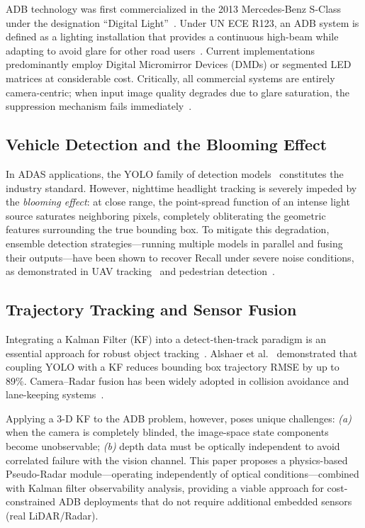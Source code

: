 \documentclass{jstarticle}
\theoremstyle{remark}
\begin{document}
ADB technology was first commercialized in the 2013 Mercedes-Benz
S-Class under the designation ``Digital Light''~\cite{Bathla2022AutonomousVehicles}.
Under UN ECE R123, an ADB system is defined as a lighting installation
that provides a continuous high-beam while adapting to avoid glare for
other road users~\cite{Shin2026DOE_AFS}. Current implementations predominantly
employ Digital Micromirror Devices (DMDs) or segmented LED matrices at
considerable cost. Critically, all commercial systems are entirely
camera-centric; when input image quality degrades due to glare
saturation, the suppression mechanism fails
immediately~\cite{Kumar2015AutonomousVehicles}.

\subsection{Vehicle Detection and the Blooming Effect}
\label{subsec:detection}

In ADAS applications, the YOLO family of detection
models~\cite{Khanam2024YOLOv5, SCIRP126758} constitutes the industry
standard. However, nighttime headlight tracking is severely impeded by
the \emph{blooming effect}: at close range, the point-spread function of
an intense light source saturates neighboring pixels, completely
obliterating the geometric features surrounding the true bounding box.
To mitigate this degradation, ensemble detection strategies---running
multiple models in parallel and fusing their outputs---have been shown
to recover Recall under severe noise conditions, as demonstrated in UAV
tracking~\cite{Alshaer2025UAV} and pedestrian
detection~\cite{Dollar2014FastPyramids}.

\subsection{Trajectory Tracking and Sensor Fusion}
\label{subsec:kf}

Integrating a Kalman Filter (KF) into a detect-then-track paradigm is
an essential approach for robust object tracking~\cite{Kalman1960}.
Alshaer et al.~\cite{Alshaer2025UAV} demonstrated that coupling YOLO
with a KF reduces bounding box trajectory RMSE by up to 89\%.
Camera--Radar fusion has been widely adopted in collision avoidance and
lane-keeping
systems~\cite{ChavezGarcia2014SensorFusion}.

Applying a 3-D KF to the ADB problem, however, poses unique
challenges: \emph{(a)} when the camera is completely blinded, the
image-space state components become unobservable; \emph{(b)} depth
data must be optically independent to avoid correlated failure with the
vision channel. This paper proposes a physics-based Pseudo-Radar
module---operating independently of optical conditions---combined with
Kalman filter observability analysis, providing a viable approach for
cost-constrained ADB deployments that do not require additional
embedded sensors (real LiDAR/Radar).
\end{document}
